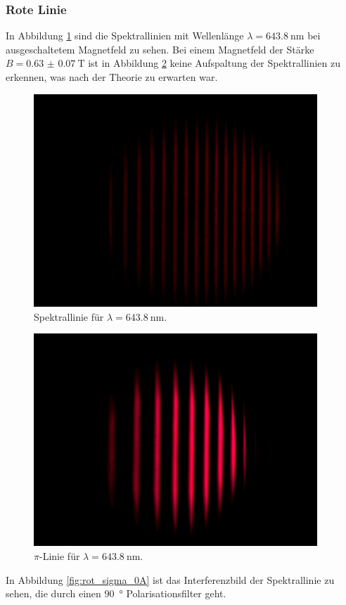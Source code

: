 \subsubsection{Rote Linie}
In Abbildung \ref{fig:rot_pi_0A} sind die Spektrallinien mit Wellenlänge $\lambda=\SI{643.8}{\nano\meter}$ bei ausgeschaltetem Magnetfeld zu sehen.
Bei einem Magnetfeld der Stärke $B=\SI{0.63(7)}{\tesla}$ ist in Abbildung \ref{fig:rot_pi_10A} keine Aufspaltung der Spektrallinien zu erkennen,
was nach der Theorie zu erwarten war.
\begin{figure}[htb]
  \centering
  \includegraphics[height=8cm]{content/pictures/rot_pi_0A.png}
  \caption{Spektrallinie für $\lambda=\SI{643.8}{\nano\meter}$.}
  \label{fig:rot_pi_0A}
\end{figure}
\begin{figure}[htb]
  \centering
  \includegraphics[height=8cm]{content/pictures/rot_pi_10A.png}
  \caption{$\pi$-Linie für $\lambda=\SI{643.8}{\nano\meter}$.}
  \label{fig:rot_pi_10A}
\end{figure}
In Abbildung \ref{fig:rot_sigma_0A} ist das Interferenzbild der Spektrallinie zu sehen, die durch einen \SI{90}{\degree} Polarisationsfilter geht.
